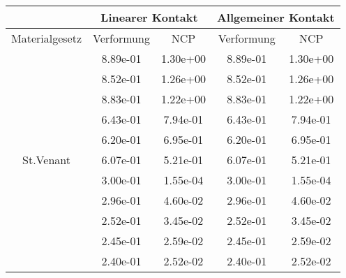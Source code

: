 \begin{table} 
\centering 
\begin{tabular}{c|cc|cc|} 
\cline{2-5} 
 & \multicolumn{2}{|c|}{Linearer Kontakt} & \multicolumn{2}{|c|}{Allgemeiner Kontakt} \\ 
\hline 
\multicolumn{1}{|c|}{Materialgesetz} & \multicolumn{1}{c|}{Verformung} & \multicolumn{1}{c|}{NCP} & \multicolumn{1}{c|}{Verformung} & \multicolumn{1}{c|}{NCP} \\ 
\hline 
\multicolumn{1}{|c|}{\multirow{26}{*}{St.Venant}} &\multicolumn{1}{|c|}{  8.89e-01} & \multicolumn{1}{|c|}{  1.30e+00} & \multicolumn{1}{|c|}{  8.89e-01} & \multicolumn{1}{|c|}{  1.30e+00} \\ 
\multicolumn{1}{|c|}{} & \multicolumn{1}{|c|}{  8.52e-01} & \multicolumn{1}{|c|}{  1.26e+00} & \multicolumn{1}{|c|}{  8.52e-01} & \multicolumn{1}{|c|}{  1.26e+00} \\ 
\multicolumn{1}{|c|}{} & \multicolumn{1}{|c|}{  8.83e-01} & \multicolumn{1}{|c|}{  1.22e+00} & \multicolumn{1}{|c|}{  8.83e-01} & \multicolumn{1}{|c|}{  1.22e+00} \\ 
\multicolumn{1}{|c|}{} & \multicolumn{1}{|c|}{  6.43e-01} & \multicolumn{1}{|c|}{  7.94e-01} & \multicolumn{1}{|c|}{  6.43e-01} & \multicolumn{1}{|c|}{  7.94e-01} \\ 
\multicolumn{1}{|c|}{} & \multicolumn{1}{|c|}{  6.20e-01} & \multicolumn{1}{|c|}{  6.95e-01} & \multicolumn{1}{|c|}{  6.20e-01} & \multicolumn{1}{|c|}{  6.95e-01} \\ 
\multicolumn{1}{|c|}{} & \multicolumn{1}{|c|}{  6.07e-01} & \multicolumn{1}{|c|}{  5.21e-01} & \multicolumn{1}{|c|}{  6.07e-01} & \multicolumn{1}{|c|}{  5.21e-01} \\ 
\multicolumn{1}{|c|}{} & \multicolumn{1}{|c|}{  3.00e-01} & \multicolumn{1}{|c|}{  1.55e-04} & \multicolumn{1}{|c|}{  3.00e-01} & \multicolumn{1}{|c|}{  1.55e-04} \\ 
\multicolumn{1}{|c|}{} & \multicolumn{1}{|c|}{  2.96e-01} & \multicolumn{1}{|c|}{  4.60e-02} & \multicolumn{1}{|c|}{  2.96e-01} & \multicolumn{1}{|c|}{  4.60e-02} \\ 
\multicolumn{1}{|c|}{} & \multicolumn{1}{|c|}{  2.52e-01} & \multicolumn{1}{|c|}{  3.45e-02} & \multicolumn{1}{|c|}{  2.52e-01} & \multicolumn{1}{|c|}{  3.45e-02} \\ 
\multicolumn{1}{|c|}{} & \multicolumn{1}{|c|}{  2.45e-01} & \multicolumn{1}{|c|}{  2.59e-02} & \multicolumn{1}{|c|}{  2.45e-01} & \multicolumn{1}{|c|}{  2.59e-02} \\ 
\multicolumn{1}{|c|}{} & \multicolumn{1}{|c|}{  2.40e-01} & \multicolumn{1}{|c|}{  2.52e-02} & \multicolumn{1}{|c|}{  2.40e-01} & \multicolumn{1}{|c|}{  2.52e-02} \\ 

\end{tabular}
\end{table}
